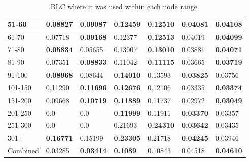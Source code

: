 \begin{table*}[h!]
\begin{tabular}{|l|l|l||l|l||l|l|}
        51-60    & 0.08827                                 & \textbf{0.09087}               & 0.12459                          & \textbf{0.12510} & 0.04081          & \textbf{0.04108} \\ \hline
        61-70    & 0.07718                                 & \textbf{0.09168}               & 0.12377                          & \textbf{0.12513} & 0.04019          & \textbf{0.04099} \\ \hline
        71-80    & \textbf{0.05834}                        & 0.05655                        & 0.13007                          & \textbf{0.13010} & 0.03881          & \textbf{0.04071} \\ \hline
        81-90    & 0.07351                                 & \textbf{0.08833}               & 0.11042                          & \textbf{0.11115} & 0.03665          & \textbf{0.03719} \\ \hline
        91-100   & \textbf{0.08968}                        & 0.08644                        & \textbf{0.14010}                 & 0.13593          & \textbf{0.03825} & 0.03756          \\ \hline
        101-150  & 0.11290                                 & \textbf{0.11696}               & \textbf{0.12676}                 & 0.12106          & 0.03335          & \textbf{0.03374} \\ \hline
        151-200  & 0.09668                                 & \textbf{0.10719}               & \textbf{0.11889}                 & 0.11737          & 0.02972          & \textbf{0.03049} \\ \hline
        201-250  & 0.0                                     & 0.0                            & \textbf{0.11999}                 & 0.11911          & \textbf{0.03370} & 0.03357          \\ \hline
        251-300  & 0.0                                     & 0.0                            & 0.21693                          & \textbf{0.24310} & \textbf{0.03642} & 0.03435          \\ \hline
        301+     & \textbf{0.16771}                        & 0.15199                        & \textbf{0.23305}                 & 0.21718          & \textbf{0.04245} & 0.03946          \\ \hline
        Combined & 0.03285                                 & \textbf{0.03414}               & \textbf{0.1089 }                 & 0.10843          & 0.04518          & \textbf{0.04610} \\ \hline
    \end{tabular}
    \caption{BLC where it was used within each node range.}
    \label{tab:BLC-degree-based-ndcg}
\end{table*}

